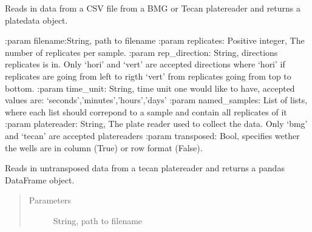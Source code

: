 \documentclass[letterpaper,10pt,english]{sphinxmanual}
\begin{document}

\begin{fulllineitems}
\label{\detokenize{platelib:platelib.plateread.read_plate}}
Reads in data from a CSV file from a BMG or Tecan platereader and returns a platedata object.

:param filename:String, path to filename
:param replicates: Positive integer, The number of replicates per sample.
:param rep\_direction: String, directions replicates is in. Only ‘hori’ and ‘vert’ are accepted directions where ‘hori’ if replicates are going from left to rigth ‘vert’ from replicates going from top to bottom. 
:param time\_unit: String, time unit one would like to have, accepted values are: ‘seconds’,’minutes’,’hours’,’days’  
:param named\_samples: List of lists,  where each list should correpond to a sample and contain all replicates of it 
:param platereader: String, The plate reader used to collect the data. Only ‘bmg’ and ‘tecan’ are accepted platereaders
:param transposed: Bool, specifies wether the wells are in column (True) or row format (False).

\end{fulllineitems}


\begin{fulllineitems}
\label{\detokenize{platelib:platelib.plateread.read_tecan}}
Reads in untransposed data from a tecan platereader and returns a pandas DataFrame object.
\begin{quote}\begin{description}
\item[{Parameters}] \leavevmode
{} \textendash{} String, path to filename

\end{description}\end{quote}

\end{fulllineitems}
\end{document}
